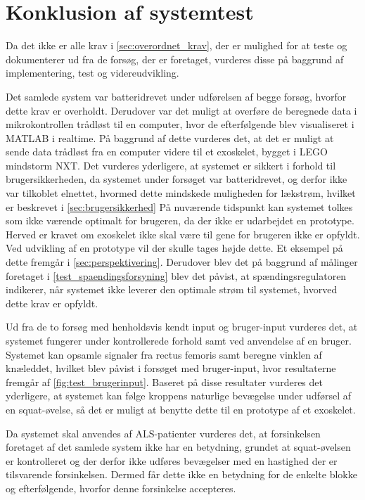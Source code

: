 \section{Konklusion af systemtest}
Da det ikke er alle krav i \autoref{sec:overordnet_krav}, der er mulighed for at teste og dokumenterer ud fra de forsøg, der er foretaget, vurderes disse på baggrund af implementering, test og videreudvikling. 

Det samlede system var batteridrevet under udførelsen af begge forsøg, hvorfor dette krav er overholdt. Derudover var det muligt at overføre de beregnede data i mikrokontrollen trådløst til en computer, hvor de efterfølgende blev visualiseret i MATLAB i realtime. På baggrund af dette vurderes det, at det er muligt at sende data trådløst fra en computer videre til et exoskelet, bygget i LEGO mindstorm NXT. Det vurderes yderligere, at systemet er sikkert i forhold til brugersikkerheden, da systemet under forsøget var batteridrevet, og derfor ikke var tilkoblet elnettet, hvormed dette mindskede muligheden for lækstrøm, hvilket er beskrevet i \autoref{sec:brugersikkerhed}
På nuværende tidspunkt kan systemet tolkes som ikke værende optimalt for brugeren, da der ikke er udarbejdet en prototype. Herved er kravet om exoskelet ikke skal være til gene for brugeren ikke er opfyldt. Ved udvikling af en prototype vil der skulle tages højde dette. Et eksempel på dette fremgår i \autoref{sec:perspektivering}. 
Derudover blev det på baggrund af målinger foretaget i \autoref{test_spaendingsforsyning} blev det påvist, at spændingsregulatoren indikerer, når systemet ikke leverer den optimale strøm til systemet, hvorved dette krav er opfyldt. 

Ud fra de to forsøg med henholdsvis kendt input og bruger-input vurderes det, at systemet fungerer under kontrollerede forhold samt ved anvendelse af en bruger. Systemet kan opsamle signaler fra rectus femoris samt beregne vinklen af knæleddet, hvilket blev påvist i forsøget med bruger-input, hvor resultaterne fremgår af \autoref{fig:test_brugerinput}. Baseret på disse resultater vurderes det yderligere, at systemet kan følge kroppens naturlige bevægelse under udførsel af en squat-øvelse, så det er muligt at benytte dette til en prototype af et exoskelet.  

Da systemet skal anvendes af ALS-patienter vurderes det, at forsinkelsen foretaget af det samlede system ikke har en betydning, grundet at squat-øvelsen er kontrolleret og der derfor ikke udføres bevægelser med en hastighed der er tilsvarende forsinkelsen. Dermed får dette ikke en betydning for de enkelte blokke og efterfølgende, hvorfor denne forsinkelse accepteres. 

